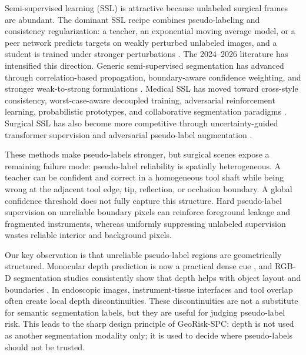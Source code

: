 \documentclass[journal]{IEEEtran}
\begin{document}
Semi-supervised learning (SSL) is attractive because unlabeled surgical frames are abundant. The dominant SSL recipe combines pseudo-labeling and consistency regularization: a teacher, an exponential moving average model, or a peer network predicts targets on weakly perturbed unlabeled images, and a student is trained under stronger perturbations \cite{tarvainen2017mean,berthelot2019mixmatch,chen2021cps,wang2022u2pl,yang2023unimatch}. The 2024--2026 literature has intensified this direction. Generic semi-supervised segmentation has advanced through correlation-based propagation, boundary-aware confidence weighting, and stronger weak-to-strong formulations \cite{sun2024corrmatch,cwbass2025,yang2025unimatchv2}. Medical SSL has moved toward cross-style consistency, worst-case-aware decoupled training, adversarial reinforcement learning, probabilistic prototypes, and collaborative segmentation paradigms \cite{liu2024crossstyle,das2024decoupled,xu2024drlssl,yuan2025probabilistic,zeng2025segment}. Surgical SSL has also become more competitive through uncertainty-guided transformer supervision and adversarial pseudo-label augmentation \cite{liu2024surgivisor,segmatch2025}.

These methods make pseudo-labels stronger, but surgical scenes expose a remaining failure mode: pseudo-label reliability is spatially heterogeneous. A teacher can be confident and correct in a homogeneous tool shaft while being wrong at the adjacent tool edge, tip, reflection, or occlusion boundary. A global confidence threshold does not fully capture this structure. Hard pseudo-label supervision on unreliable boundary pixels can reinforce foreground leakage and fragmented instruments, whereas uniformly suppressing unlabeled supervision wastes reliable interior and background pixels.

Our key observation is that unreliable pseudo-label regions are geometrically structured. Monocular depth prediction is now a practical dense cue \cite{ranftl2021vision}, and RGB-D segmentation studies consistently show that depth helps with object layout and boundaries \cite{mi2017depth,zhu2020depth,yin2026dformer}. In endoscopic images, instrument-tissue interfaces and tool overlap often create local depth discontinuities. These discontinuities are not a substitute for semantic segmentation labels, but they are useful for judging pseudo-label risk. This leads to the sharp design principle of GeoRisk-SPC: depth is not used as another segmentation modality only; it is used to decide where pseudo-labels should not be trusted.
\end{document}
